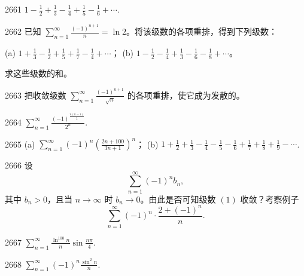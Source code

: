 \begin{prob}[M]{2661}
$1 - \frac{1}{2} + \frac{1}{3} - \frac{1}{4} + \frac{1}{5} - \frac{1}{6} + \cdots$.
\end{prob}

\begin{prob}[M]{2662}
已知 $\sum_{n=1}^{\infty} \frac{(-1)^{n+1}}{n} = \ln 2$。将该级数的各项重排，得到下列级数：

(a) $1 + \frac{1}{3} - \frac{1}{2} + \frac{1}{5} + \frac{1}{7} - \frac{1}{4} + \cdots$； \qquad (b) $1 - \frac{1}{2} - \frac{1}{4} + \frac{1}{3} - \frac{1}{6} - \frac{1}{8} + \cdots$。

求这些级数的和。
\end{prob}

\begin{prob}[M]{2663}
把收敛级数 $\sum_{n=1}^{\infty} \frac{(-1)^{n+1}}{\sqrt{n}}$ 的各项重排，使它成为发散的。
\end{prob}


\begin{prob}[S]{2664}
$\sum_{n=1}^{\infty} \frac{(-1)^{\frac{n(n-1)}{2}}}{2^n}$.
\end{prob}

\begin{prob}[M]{2665}
(a) $\sum_{n=1}^{\infty} (-1)^n \left(\frac{2n+100}{3n+1}\right)^n$； \qquad (b) $1 + \frac{1}{2} + \frac{1}{3} - \frac{1}{4} - \frac{1}{5} - \frac{1}{6} + \frac{1}{7} + \frac{1}{8} + \frac{1}{9} - \cdots$.
\end{prob}

\begin{prob}[M]{2666}
设
\[\sum_{n=1}^{\infty} (-1)^n b_n, \tag{1}\]
其中 $b_n > 0$，且当 $n \to \infty$ 时 $b_n \to 0$。由此是否可知级数 $(1)$ 收敛？考察例子
\[\sum_{n=1}^{\infty} (-1)^n \cdot \frac{2 + (-1)^n}{n}.\]
\end{prob}


\begin{prob}[S]{2667}
$\sum_{n=1}^{\infty} \frac{\ln^{100} n}{n} \sin \frac{n\pi}{4}$.
\end{prob}

\begin{prob}[S]{2668}
$\sum_{n=1}^{\infty} (-1)^n \frac{\sin^2 n}{n}$.
\end{prob}

